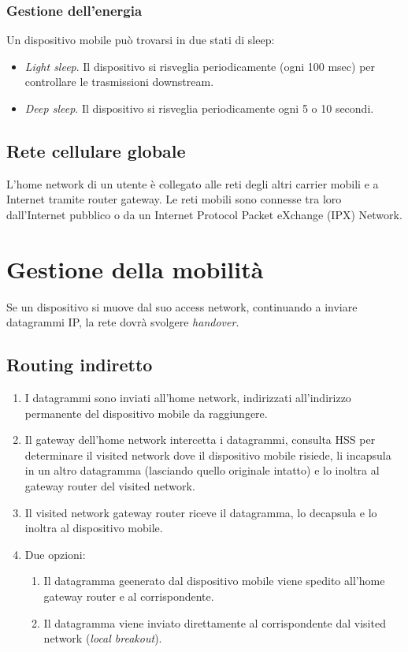 \documentclass[11pt]{book}
\begin{document}
\subsubsection{Gestione dell'energia}
Un dispositivo mobile può trovarsi in due stati di sleep:
\begin{itemize}
    \item \textit{Light sleep}. Il dispositivo si risveglia periodicamente (ogni 100 msec) per controllare le trasmissioni
    downstream.
    \item \textit{Deep sleep}. Il dispositivo si risveglia periodicamente ogni 5 o 10 secondi.
\end{itemize}
\subsection{Rete cellulare globale}
L'home network di un utente è collegato alle reti degli altri carrier mobili e a Internet tramite router gateway. Le reti 
mobili sono connesse tra loro dall'Internet pubblico o da un Internet Protocol Packet eXchange (IPX) Network.
\section{Gestione della mobilità}
Se un dispositivo si muove dal suo access network, continuando a inviare datagrammi IP, la rete dovrà svolgere \textit{handover}.
\subsection{Routing indiretto}
\begin{enumerate}
    \item I datagrammi sono inviati all'home network, indirizzati all'indirizzo permanente del dispositivo mobile da raggiungere.
    \item Il gateway dell'home network intercetta i datagrammi, consulta HSS per determinare il visited network dove il 
    dispositivo mobile risiede, li incapsula in un altro datagramma (lasciando quello originale intatto) e lo inoltra al 
    gateway router del visited network.
    \item Il visited network gateway router riceve il datagramma, lo decapsula e lo inoltra al dispositivo mobile.
    \item Due opzioni:
    \begin{enumerate}
        \item Il datagramma geenerato dal dispositivo mobile viene spedito all'home gateway router e al corrispondente.
        \item Il datagramma viene inviato direttamente al corrispondente dal visited network (\textit{local breakout}).
    \end{enumerate}
\end{enumerate}
\end{document}
